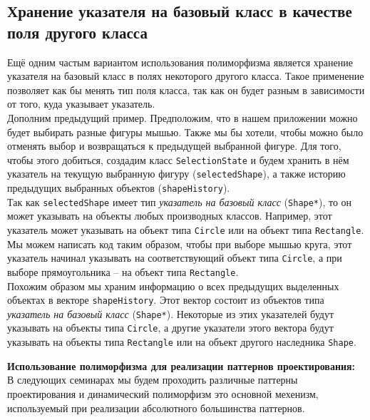 \documentclass{article}
\begin{document}
\subsection*{Хранение указателя на базовый класс в качестве поля другого класса}


\begin{minipage}[t]{0.4\textwidth}
\vspace{10pt}
Ещё одним частым вариантом использования полиморфизма является хранение указателя на базовый класс в полях некоторого другого класса. Такое применение позволяет как бы менять тип поля класса, так как он будет разным в зависимости от того, куда указывает указатель.\\

Дополним предыдущий пример. Предположим, что в нашем приложении можно будет выбирать разные фигуры мышью. Также мы бы хотели, чтобы можно было отменять выбор и возвращаться к предыдущей выбранной фигуре. Для того, чтобы этого добиться, создадим класс \texttt{SelectionState} и будем хранить в нём указатель на текущую выбранную фигуру (\texttt{selectedShape}), а также историю предыдущих выбранных объектов (\texttt{shapeHistory}).\\

Так как \texttt{selectedShape} имеет тип \textit{указатель на базовый класс}  (\texttt{Shape*}), то он может указывать на объекты любых производных классов. Например, этот указатель может указывать на объект типа \texttt{Circle} или на объект типа \texttt{Rectangle}. Мы можем написать код таким образом, чтобы при выборе мышью круга, этот указатель начинал указывать на соответствующий объект типа \texttt{Circle}, а при выборе прямоугольника -- на объект типа \texttt{Rectangle}.\\

Похожим образом мы храним информацию о всех предыдущих выделенных объектах в векторе \texttt{shapeHistory}. Этот вектор состоит из объектов типа \textit{указатель на базовый класс} (\texttt{Shape*}). Некоторые из этих указателей будут указывать на объекты типа \texttt{Circle}, а другие указатели этого вектора будут указывать на объекты типа \texttt{Rectangle} или на объект другого наследника \texttt{Shape}.\\

\vspace{20pt}

\textbf{Использование полиморфизма для реализации паттернов проектирования:}\\
В следующих семинарах мы будем проходить различные паттерны проектирования и динамический полиморфизм это основной мехенизм, используемый при реализации абсолютного большинства паттернов.

\vfill
\end{minipage}
\end{document}
